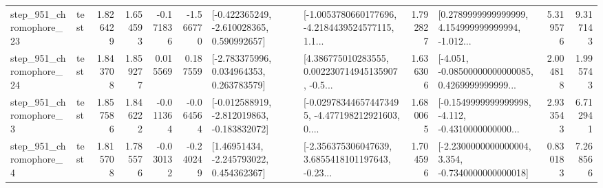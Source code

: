\begin{tabular}{llrrrrllrlrr}
  step\_951\_chromophore\_23 &      test &      1.826429 &    1.654593 &     -0.171836 & -1.566770 &   [-0.422365249, -2.610028365, 0.590992657] &  [-1.0053780660177696, -4.2184439524577115, 1.1... &       1.792827 &  [0.2789999999999999, 4.154999999999994, -1.012... &            5.319576 &          9.317143 \\
  step\_951\_chromophore\_24 &      test &      1.843708 &    1.859277 &      0.015569 &  0.187559 &    [-2.783375996, 0.034964353, 0.263783579] &  [4.386775010283555, 0.002230714945135907, -0.5... &       1.636306 &  [-4.051, -0.08500000000000085, 0.4269999999999... &            2.004818 &          1.995743 \\
   step\_951\_chromophore\_3 &      test &      1.857586 &    1.846222 &     -0.011364 & -0.064564 &  [-0.012588919, -2.812019863, -0.183832072] &  [-0.029783446574473495, -4.477198212921603, 0.... &       1.680065 &  [-0.1549999999999998, -4.112, -0.4310000000000... &            2.933543 &          6.712941 \\
   step\_951\_chromophore\_4 &      test &      1.815708 &    1.785576 &     -0.030132 & -0.240249 &     [1.46951434, -2.245793022, 0.454362367] &  [-2.356375306047639, 3.6855418101197643, -0.23... &       1.704596 &  [-2.2300000000000004, 3.354, -0.7340000000000018] &            0.830183 &          7.268566 \\
\bottomrule
\end{tabular}

